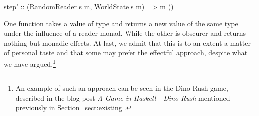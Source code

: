 \documentclass[
  digital, %
  color,   %
  table,   %
  oneside, %
  lof,     %
  lot,     %
]{fithesis3}
\newcommand{\cpp}{C\nolinebreak\texttt{+}\nolinebreak\texttt{+}}
\begin{document}
{\begin{haskell}
step' :: (RandomReader s m, WorldState s m) => m ()
\end{haskell}
One function takes a value of type  and returns
a new value of the same type under the influence of a reader monad.
While the other is obscurer and returns nothing but monadic effects.
At last, we admit that this is to an extent a matter of personal taste
and that some may prefer the effectful approach, despite what we have argued.\footnote{
An example of such an approach can be seen in the Dino Rush game,
described in the blog post \emph{A Game in Haskell - Dino Rush}\cite{dinorush} mentioned
previously in Section~\ref{sect:existing}.
}










}
\end{document}
